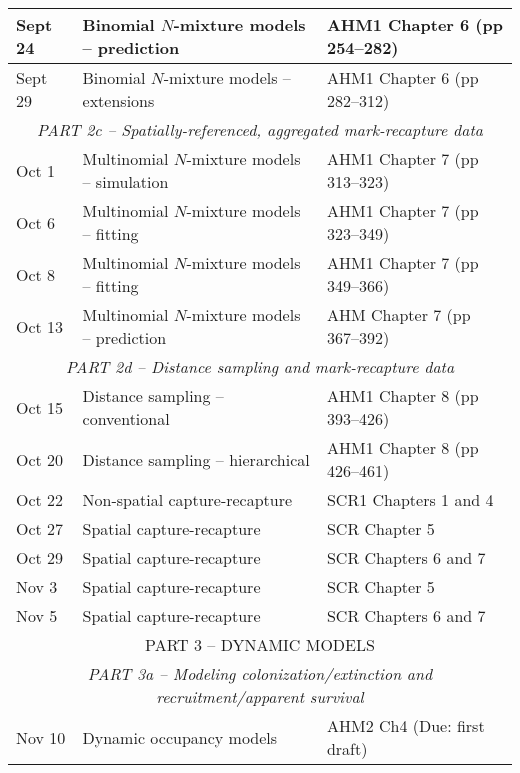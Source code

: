 \documentclass[12pt]{article}
\begin{document}
\begin{center}
\begin{tabular}[c]{lll}
Sept 24    & Binomial $N$-mixture models -- prediction    & AHM1 Chapter 6 (pp 254--282)              \\
\hline
Sept 29    & Binomial $N$-mixture models -- extensions    & AHM1 Chapter 6 (pp 282--312)              \\
\hline
           \multicolumn{3}{c}{\it PART 2c -- Spatially-referenced, aggregated mark-recapture data}    \\
\hline
Oct 1      & Multinomial $N$-mixture models -- simulation & AHM1 Chapter 7 (pp 313--323)              \\
\hline
Oct 6      & Multinomial $N$-mixture models -- fitting    & AHM1 Chapter 7 (pp 323--349)              \\
Oct 8      & Multinomial $N$-mixture models -- fitting    & AHM1 Chapter 7 (pp 349--366)              \\
\hline
Oct 13     & Multinomial $N$-mixture models -- prediction & AHM Chapter 7 (pp 367--392)               \\
\hline
           \multicolumn{3}{c}{\it PART 2d -- Distance sampling and mark-recapture data}               \\
\hline
Oct 15     & Distance sampling -- conventional            & AHM1 Chapter 8 (pp 393--426)              \\
\hline
Oct 20     & Distance sampling -- hierarchical            & AHM1 Chapter 8 (pp 426--461)              \\
Oct 22     & Non-spatial capture-recapture                & SCR1 Chapters 1 and 4                     \\
\hline
Oct 27     & Spatial capture-recapture                    & SCR Chapter 5                             \\
Oct 29     & Spatial capture-recapture                    & SCR Chapters 6 and 7                      \\
\hline
Nov 3      & Spatial capture-recapture                    & SCR Chapter 5                             \\
Nov 5      & Spatial capture-recapture                    & SCR Chapters 6 and 7                      \\
\hline
           \multicolumn{3}{c}{PART 3 -- DYNAMIC MODELS}                                               \\
           \multicolumn{3}{c}{\it PART 3a -- Modeling colonization/extinction and recruitment/apparent survival}              \\
\hline
Nov 10     & Dynamic occupancy models                     & AHM2 Ch4 (Due: first draft)               \\

\end{tabular}
\end{center}
\end{document}
